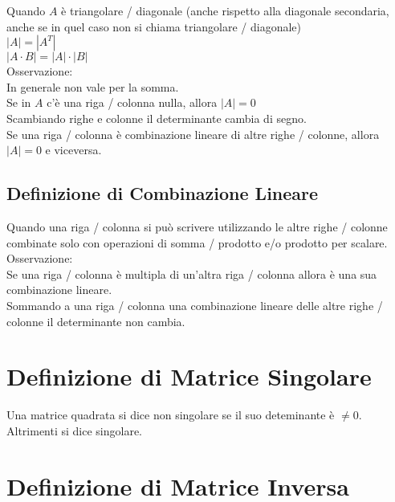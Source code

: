\documentclass[a4paper, twoside, italian, 11pt]{book}
\newcommand{\detm}[1] {\left | #1 \right |}
\begin{document}
\noindent
Quando $A$ è triangolare / diagonale (anche rispetto alla diagonale secondaria, anche se in quel caso non si chiama triangolare / diagonale) \\

\noindent
$\detm A = \detm{A^T}$ \\

\noindent
$\detm{A \cdot B} = \detm A \cdot \detm B$ \\

\noindent
Osservazione: \\
In generale non vale per la somma. \\

\noindent
Se in $A$ c'è una riga / colonna nulla, allora $\detm A = 0$ \\

\noindent
Scambiando righe e colonne %
il determinante cambia di segno. \\

\noindent
Se una riga / colonna è combinazione lineare di altre righe / colonne, allora $\detm A = 0$ e viceversa.


\subsection{Definizione di Combinazione Lineare}

Quando una riga / colonna si può scrivere utilizzando le altre righe / colonne combinate solo con operazioni di somma / prodotto e/o prodotto per scalare. \\

\noindent
Osservazione: \\
Se una riga / colonna è multipla di un'altra riga / colonna allora è una sua combinazione lineare. \\

\noindent
Sommando a una riga / colonna una combinazione lineare delle altre righe / colonne il determinante non cambia. \\



\section{Definizione di Matrice Singolare}
Una matrice quadrata si dice non singolare se il suo deteminante è $\neq 0$. Altrimenti si dice singolare.



\section{Definizione di Matrice Inversa}
\end{document}
